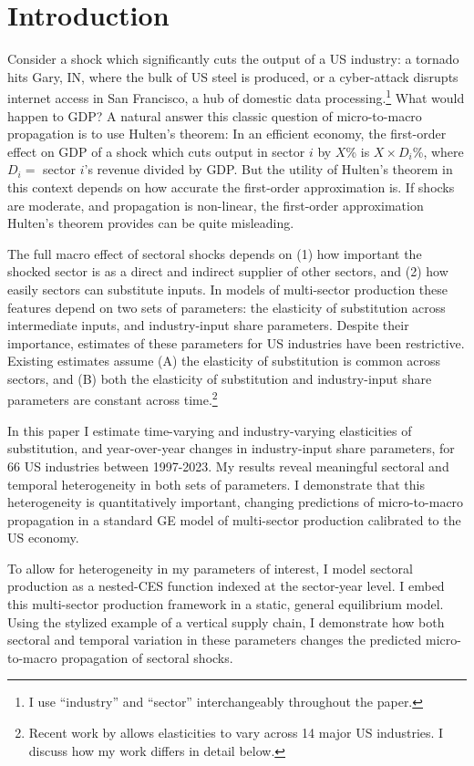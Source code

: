 \documentclass[11pt]{article}
\begin{document}
\section*{Introduction}

Consider a shock which significantly cuts the output of a US industry: a tornado hits Gary, IN, where the bulk of US steel is produced, or a cyber-attack disrupts internet access in San Francisco, a hub of domestic data processing.\footnote{I use ``industry'' and ``sector'' interchangeably throughout the paper.} What would happen to GDP? A natural answer this classic question of micro-to-macro propagation is to use Hulten's theorem: In an efficient economy, the first-order effect on GDP of a shock which cuts output in sector $i$ by $X$\% is $X \times D_i$\%, where $D_i=$ sector $i$'s revenue divided by GDP. But the utility of Hulten's theorem in this context depends on how accurate the first-order approximation is. If shocks are moderate, and propagation is non-linear, the first-order approximation Hulten's theorem provides can be quite misleading. 

The full macro effect of sectoral shocks depends on (1) how important the shocked sector is as a direct and indirect supplier of other sectors, and (2) how easily sectors can substitute inputs. In models of multi-sector production these features depend on two sets of parameters: the elasticity of substitution across intermediate inputs, and industry-input share parameters. Despite their importance, estimates of these parameters for US industries have been restrictive. Existing estimates assume (A) the elasticity of substitution is common across sectors, and (B) both the elasticity of substitution and industry-input share parameters are constant across time.\footnote{Recent work by \citet{comepoirierReallocationHeterogeneousElasticities2023} allows elasticities to vary across 14 major US industries. I discuss how my work differs in detail below.} 

In this paper I estimate time-varying and industry-varying elasticities of substitution, and year-over-year changes in industry-input share parameters, for 66 US industries between 1997-2023. My results reveal meaningful sectoral and temporal heterogeneity in both sets of parameters. I demonstrate that this heterogeneity is quantitatively important, changing predictions of micro-to-macro propagation in a standard GE model of multi-sector production calibrated to the US economy.

To allow for heterogeneity in my parameters of interest, I model sectoral production as a nested-CES function indexed at the sector-year level. I embed this multi-sector production framework in a static, general equilibrium model. Using the stylized example of a vertical supply chain, I demonstrate how both sectoral and temporal variation in these parameters changes the predicted micro-to-macro propagation of sectoral shocks. 
\end{document}
